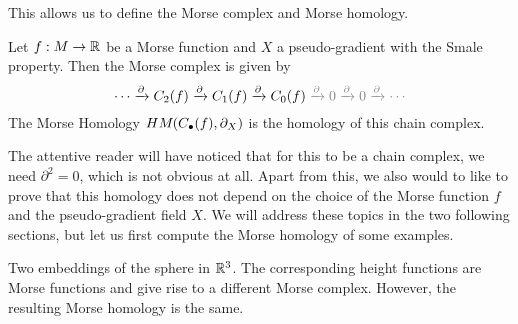 This allows us to define the Morse complex and Morse homology.
\begin{definition}
    Let $f:M \to \mathbb{R}$ be a Morse function and $X$ a pseudo-gradient with the Smale property.
    Then the Morse complex is given by 
    \[
        \cdots \xrightarrow{\partial} C_2(f) \xrightarrow{\partial}  C_1(f) \xrightarrow{\partial} C_0(f) \textcolor{gray}{{} \xrightarrow{\partial}  0 \xrightarrow{\partial }0 \xrightarrow{\partial}  \cdots}
    \] 
    The Morse Homology $HM_{}(C_\bullet(f), \partial_X)$ is the homology of this chain complex.
\end{definition}
The attentive reader will have noticed that for this to be a chain complex, we need $\partial^2 = 0$, which is not obvious at all.
Apart from this, we also would to like to prove that  this homology does not depend on the choice of the Morse function $f$ and the pseudo-gradient field $X$.
We will address these topics in the two following sections, but let us first compute the Morse homology of some examples.


\begin{marginfigure}
    \centering
    \caption{Two embeddings of the sphere in $\mathbb{R}^3$.
        The corresponding height functions are Morse functions and give rise to a different Morse complex.
        However, the resulting Morse homology is the same.
    }
    \label{fig:other-sphere-and-normal-sphere-morse-complex}
\end{marginfigure}

